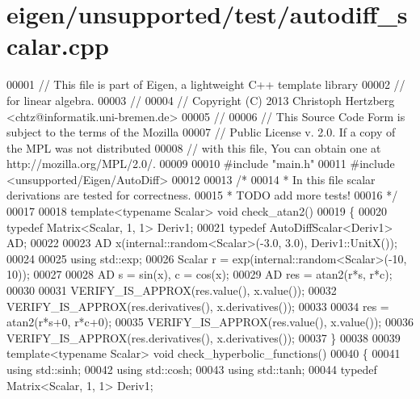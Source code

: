 \hypertarget{eigen_2unsupported_2test_2autodiff__scalar_8cpp_source}{}\section{eigen/unsupported/test/autodiff\+\_\+scalar.cpp}
\label{eigen_2unsupported_2test_2autodiff__scalar_8cpp_source}

\begin{DoxyCode}
00001 \textcolor{comment}{// This file is part of Eigen, a lightweight C++ template library}
00002 \textcolor{comment}{// for linear algebra.}
00003 \textcolor{comment}{//}
00004 \textcolor{comment}{// Copyright (C) 2013 Christoph Hertzberg <chtz@informatik.uni-bremen.de>}
00005 \textcolor{comment}{//}
00006 \textcolor{comment}{// This Source Code Form is subject to the terms of the Mozilla}
00007 \textcolor{comment}{// Public License v. 2.0. If a copy of the MPL was not distributed}
00008 \textcolor{comment}{// with this file, You can obtain one at http://mozilla.org/MPL/2.0/.}
00009 
00010 \textcolor{preprocessor}{#include "main.h"}
00011 \textcolor{preprocessor}{#include <unsupported/Eigen/AutoDiff>}
00012 
00013 \textcolor{comment}{/*}
00014 \textcolor{comment}{ * In this file scalar derivations are tested for correctness.}
00015 \textcolor{comment}{ * TODO add more tests!}
00016 \textcolor{comment}{ */}
00017 
00018 \textcolor{keyword}{template}<\textcolor{keyword}{typename} Scalar> \textcolor{keywordtype}{void} check\_atan2()
00019 \{
00020   \textcolor{keyword}{typedef} Matrix<Scalar, 1, 1> Deriv1;
00021   \textcolor{keyword}{typedef} AutoDiffScalar<Deriv1> AD;
00022   
00023   AD x(internal::random<Scalar>(-3.0, 3.0), Deriv1::UnitX());
00024   
00025   \textcolor{keyword}{using} std::exp;
00026   Scalar r = exp(internal::random<Scalar>(-10, 10));
00027   
00028   AD s = sin(x), c = cos(x);
00029   AD res = atan2(r*s, r*c);
00030   
00031   VERIFY\_IS\_APPROX(res.value(), x.value());
00032   VERIFY\_IS\_APPROX(res.derivatives(), x.derivatives());
00033 
00034   res = atan2(r*s+0, r*c+0);
00035   VERIFY\_IS\_APPROX(res.value(), x.value());
00036   VERIFY\_IS\_APPROX(res.derivatives(), x.derivatives());
00037 \}
00038 
00039 \textcolor{keyword}{template}<\textcolor{keyword}{typename} Scalar> \textcolor{keywordtype}{void} check\_hyperbolic\_functions()
00040 \{
00041   \textcolor{keyword}{using} std::sinh;
00042   \textcolor{keyword}{using} std::cosh;
00043   \textcolor{keyword}{using} std::tanh;
00044   \textcolor{keyword}{typedef} Matrix<Scalar, 1, 1> Deriv1;

\end{DoxyCode}

